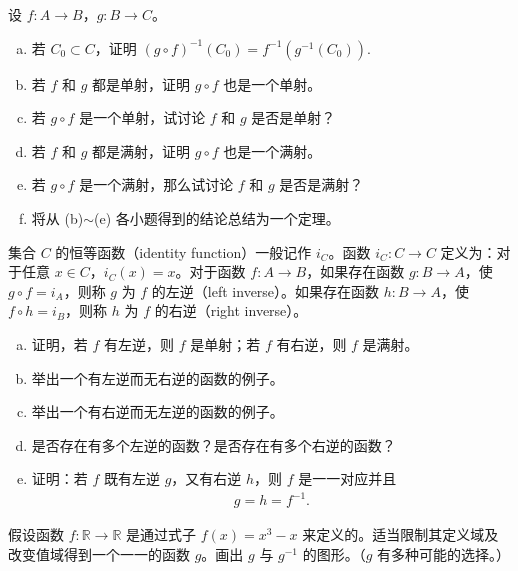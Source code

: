 \documentclass[../../main.tex]{subfiles}
\begin{document}
\begin{exercise}\label{exercise:ch01-函数-4}
设 $f: A \longrightarrow B$，$g: B \longrightarrow C$。
\begin{enumerate}[(a)]
\item 若 $C_{0} \subset C$，证明 $(g \circ f)^{-1}(C_{0}) = f^{-1}(g^{-1}(C_{0}))$.
\item 若 $f$ 和 $g$ 都是单射，证明 $g \circ f$ 也是一个单射。
\item 若 $g \circ f$ 是一个单射，试讨论 $f$ 和 $g$ 是否是单射？
\item 若 $f$ 和 $g$ 都是满射，证明 $g \circ f$ 也是一个满射。
\item 若 $g \circ f$ 是一个满射，那么试讨论 $f$ 和 $g$ 是否是满射？
\item 将从 (b)$\sim$(e) 各小题得到的结论总结为一个定理。
\end{enumerate}
\end{exercise}

\begin{exercise}\label{exercise:ch01-函数-5}
集合 $C$ 的恒等函数（identity function）一般记作 $i_{C}$。函数 $i_{C}: C \longrightarrow C$ 定义为：对于任意 $x \in C$，$i_{C}(x) = x$。对于函数 $f: A \longrightarrow B$，如果存在函数 $g: B \longrightarrow A$，使 $g \circ f = i_{A}$，则称 $g$ 为 $f$ 的左逆（left inverse）。如果存在函数 $h: B \longrightarrow A$，使 $f \circ h = i_{B}$，则称 $h$ 为 $f$ 的右逆（right inverse）。
\begin{enumerate}[(a)]
\item 证明，若 $f$ 有左逆，则 $f$ 是单射；若 $f$ 有右逆，则 $f$ 是满射。
\item 举出一个有左逆而无右逆的函数的例子。
\item 举出一个有右逆而无左逆的函数的例子。
\item 是否存在有多个左逆的函数？是否存在有多个右逆的函数？
\item 证明：若 $f$ 既有左逆 $g$，又有右逆 $h$，则 $f$ 是一一对应并且
\begin{align*}
g = h = f^{-1}.
\end{align*}
\end{enumerate}
\end{exercise}

\begin{exercise}\label{exercise:ch01-函数-6}
假设函数 $f: \mathbb{R} \longrightarrow \mathbb{R}$ 是通过式子 $f(x) = x^{3} - x$ 来定义的。适当限制其定义域及改变值域得到一个一一的函数 $g$。画出 $g$ 与 $g^{-1}$ 的图形。（$g$ 有多种可能的选择。）
\end{exercise}
\end{document}
